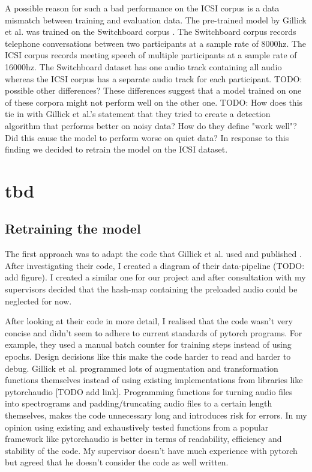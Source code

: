 \documentclass[bsc,frontabs,parskip,deptreport]{infthesis}
\begin{document}
A possible reason for such a bad performance on the ICSI corpus is a data mismatch between training and evaluation data. The pre-trained model by Gillick et al. \cite{gillick2021robust} was trained on the Switchboard corpus \cite{switchboard-corpus}. The Switchboard corpus records telephone conversations between two participants at a sample rate of 8000hz. The ICSI corpus records meeting speech of multiple participants at a sample rate of 16000hz. The Switchboard dataset has one audio track containing all audio whereas the ICSI corpus has a separate audio track for each participant.  
TODO: possible other differences?
These differences suggest that a model trained on one of these corpora might not perform well on the other one. 
TODO: How does this tie in with Gillick et al.'s statement that they tried to create a detection algorithm that performs better on noisy data? How do they define "work well"? Did this cause the model to perform worse on quiet data?
In response to this finding we decided to retrain the model on the ICSI dataset. 

\chapter{tbd}
\section{Retraining the model}
The first approach was to adapt the code that Gillick et al. used and published \cite{gillick-codebase}. After investigating their code, I created a diagram of their data-pipeline (TODO: add figure). 
I created a similar one for our project and after consultation with my supervisors decided that the hash-map containing the preloaded audio could be neglected for now. 

After looking at their code in more detail,  
I realised that the code wasn't very concise and didn't seem to adhere to current standards of pytorch programs. 
For example, they used a manual batch counter for training steps instead of using epochs.  
Design decisions like this make the code harder to read and harder to debug. 
Gillick et al. programmed lots of augmentation and transformation functions themselves instead of using existing implementations from libraries like pytorchaudio [TODO add link]. 
Programming functions for turning audio files into spectrograms and padding/truncating audio files to a certain length themselves, makes the code unnecessary long and introduces risk for errors. In my opinion using existing and exhaustively tested functions from a popular framework like pytorchaudio is better in terms of readability, efficiency and stability of the code.
My supervisor doesn't have much experience with pytorch but agreed that he doesn't consider the code as well written.
\end{document}
